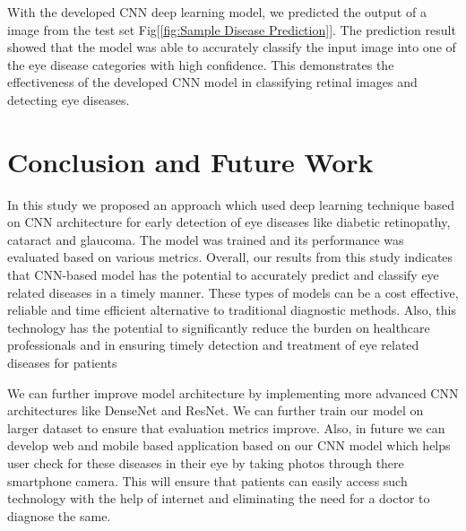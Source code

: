 \documentclass[conference]{IEEEtran}
\begin{document}
\vspace{5pt}
With the developed CNN deep learning model, we predicted the output of a image from the test set Fig[\ref{fig:Sample Disease Prediction}]. The prediction result showed that the model was able to accurately classify the input image into one of the eye disease categories with high confidence. This demonstrates the effectiveness of the developed CNN model in classifying retinal images and detecting eye diseases.

\vspace{5pt}
\section{Conclusion and Future Work}
In this study we proposed an approach which used deep learning technique based on CNN architecture for early detection of eye diseases like diabetic retinopathy, cataract and glaucoma. The model was trained and its performance was evaluated based on various metrics. Overall, our results from this study indicates that CNN-based model has the potential to accurately predict and classify eye related diseases in a timely manner. These types of models can be a cost effective, reliable and time efficient alternative to traditional diagnostic methods. Also, this technology has the potential to significantly reduce the burden on healthcare professionals and in ensuring timely detection and treatment of eye related diseases for patients

\vspace{5pt}
We can further improve model architecture by implementing more advanced CNN architectures like DenseNet and ResNet. We can further train our model on larger dataset to ensure that evaluation metrics improve. Also, in future we can develop web and mobile based application based on our CNN model which helps user check for these diseases in their eye by taking photos through there smartphone camera. This will ensure that patients can easily access such technology with the help of internet and eliminating the need for a doctor to diagnose the same.
\end{document}
